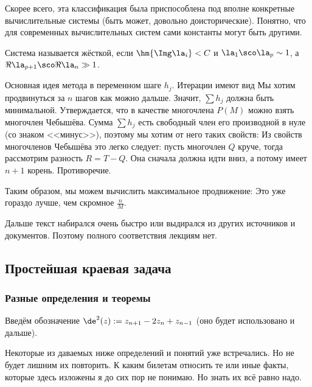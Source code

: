 \documentclass[a4paper]{article}
\begin{document}
\begin{petit}
Скорее всего, эта классификация была приспособлена под вполне
конкретные вычислительные системы (быть может, довольно
доисторические). Понятно, что для современных вычислительных систем
сами константы могут быть другими.
\end{petit}

\begin{df}
Система называется жёсткой, если $\hm{\Img \la_i} < C$ и
$\la_1\sco\la_p \sim 1$, а $\Re \la_{p+1}\sco \Re \la_n \gg 1$.
\end{df}

Основная идея метода в переменном шаге $h_j$.  Итерации имеют вид
  Мы хотим продвинуться за $n$
шагов как можно дальше. Значит, $\sum h_j$ должна быть минимальной.
Утверждается, что в качестве многочлена $P(M)$ можно взять многочлен
Чебышёва. Сумма $\sum h_j$ есть свободный член его производной в нуле
(со знаком <<минус>>), поэтому мы хотим от него таких свойств:
  Из свойств
многочленов Чебышёва это легко следует: пусть многочлен $Q$ круче,
тогда рассмотрим разность $R = T-Q$.  Она сначала должна идти вниз, а
потому имеет $n+1$ корень. Противоречие.

Таким образом, мы можем вычислить максимальное продвижение:   Это уже гораздо лучше, чем скромное $\frac nM$.

\begin{petit}
Дальше текст набирался очень быстро или выдирался из других источников
и документов.  Поэтому полного соответствия лекциям нет.
\end{petit}

\subsection{Простейшая краевая задача}

\subsubsection{Разные определения и теоремы}

Введём обозначение $\de^2 (z) := z_{n+1}-2z_n + z_{n-1}$ (оно будет
использовано и дальше).

\begin{petit}
Некоторые из даваемых ниже определений и понятий уже встречались. Но
не будет лишним их повторить.  К каким билетам относить те или иные
факты, которые здесь изложены я до сих пор не понимаю. Но знать их всё
равно надо.
\end{petit}
\end{document}
